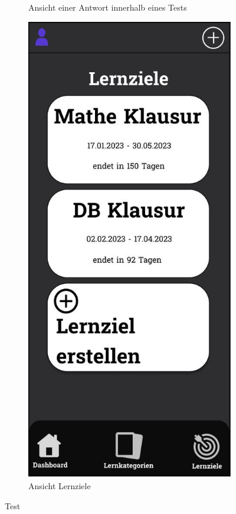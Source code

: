\begin{figure}[htbp]
\begin{subfigure}[b]{0.45\linewidth}
          \caption{Ansicht einer Antwort innerhalb eines Tests}
          \label{fig:test-antwort}
        \end{subfigure}
        \hfill
        \begin{subfigure}[b]{0.45\linewidth}
          \centering
          \includegraphics[width=\linewidth]{images/Mockups/Lernziele.JPG}
          \caption{Ansicht Lernziele}
          \label{fig:lernziele}
        \end{subfigure}
        \caption{Test}
      \end{figure}

